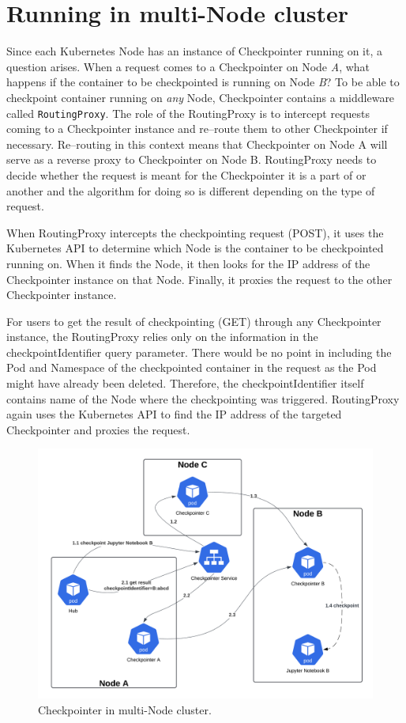 \documentclass[
  digital,     %
  oneside,     %
  nosansbold,  %
  nocolorbold, %
  lof,         %
  nolot,         %
]{fithesis4}
\begin{document}
\section{Running in multi-Node cluster}
Since each Kubernetes Node has an instance of Checkpointer running on it, a question arises. When a request comes to a Checkpointer on Node \emph{A}, what happens if the container to be checkpointed is running on Node \emph{B}? To be able to checkpoint container running on \emph{any} Node, Checkpointer contains a middleware called \texttt{RoutingProxy}. The role of the RoutingProxy is to intercept requests coming to a Checkpointer instance and re--route them to other Checkpointer if necessary. Re--routing in this context means that Checkpointer on Node A will serve as a reverse proxy to Checkpointer on Node B. RoutingProxy needs to decide whether the request is meant for the Checkpointer it is a part of or another and the algorithm for doing so is different depending on the type of request.

When RoutingProxy intercepts the checkpointing request (POST), it uses the Kubernetes API to determine which Node is the container to be checkpointed running on. When it finds the Node, it then looks for the IP address of the Checkpointer instance on that Node. Finally, it proxies the request to the other Checkpointer instance.

For users to get the result of checkpointing (GET) through any Checkpointer instance, the RoutingProxy relies only on the information in the checkpointIdentifier query parameter. There would be no point in including the Pod and Namespace of the checkpointed container in the request as the Pod might have already been deleted. Therefore, the checkpointIdentifier itself contains name of the Node where the checkpointing was triggered. RoutingProxy again uses the Kubernetes API to find the IP address of the targeted Checkpointer and proxies the request.

\begin{figure}[H]
  \begin{center}
  \includegraphics[width=\textwidth]{figures/multi-cluster-checkpoint.png}
  \end{center}
  \caption{Checkpointer in multi-Node cluster.}
  \label{fig:multi-cluster-checkpoint}
\end{figure}
\end{document}
